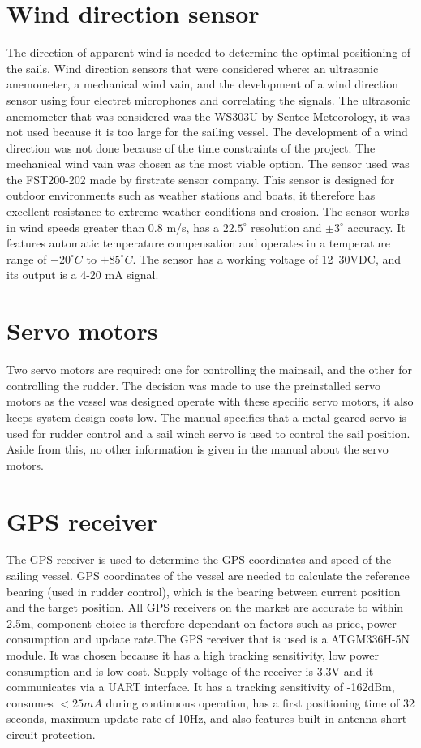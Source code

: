 \section{Wind direction sensor}
The direction of apparent wind is needed to determine the optimal positioning of the sails. Wind direction sensors that were considered where: an ultrasonic 
anemometer, a mechanical wind vain, and the development of a wind direction sensor using four electret microphones and correlating the signals. The ultrasonic
anemometer that was considered was the WS303U by Sentec Meteorology, it was not used because it is too large for the sailing vessel. The development of a 
wind direction was not done because of the time constraints of the project. The mechanical wind vain was chosen as the most viable option. The sensor used was 
the FST200-202\cite{wind_sensor} made by firstrate sensor company. This sensor is designed for outdoor environments such as weather stations and boats, it therefore has 
excellent resistance to extreme weather conditions and erosion. The sensor works in wind speeds greater than 0.8 m/s, has a $22.5^{\circ}$ resolution and 
$\pm 3^{\circ}$ accuracy. It features automatic temperature compensation and operates in a temperature range of $-20^{\circ}C$ to $+85^{\circ}C$. The 
sensor has a working voltage of 12~30VDC, and its output is a 4-20 mA signal. 

\section{Servo motors}
Two servo motors are required: one for controlling the mainsail, and the other for controlling the rudder. The decision was made to use the preinstalled servo motors as 
the vessel was designed operate with these specific 
servo motors, it also keeps system design costs low. The manual specifies that a metal geared servo is used for rudder control
and a sail winch servo is used to control the sail position. Aside from this, no other information is given in the manual about the servo motors.  

\section{GPS receiver}
The GPS receiver is used to determine the GPS coordinates and speed of the sailing vessel. GPS coordinates of the vessel are needed to calculate the reference bearing 
(used in rudder control),
which is the bearing between current position and the target position. All GPS receivers on the market are accurate to within 2.5m, component choice is 
therefore dependant on factors such as price, power consumption and update rate.The GPS receiver that is used is a ATGM336H-5N\cite{GPS} module. It was chosen because it 
has a high tracking sensitivity, low power consumption and is low cost. Supply voltage of the receiver is 3.3V and it communicates via a UART interface. It has a 
tracking sensitivity of -162dBm, consumes $<25mA$ during continuous operation, 
has a first positioning time of 32 seconds, maximum update rate of 10Hz, and also features built in antenna short circuit protection.

